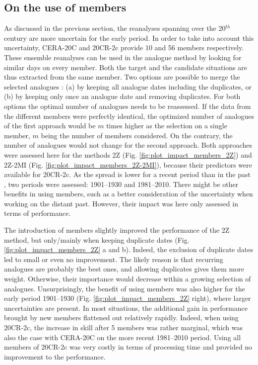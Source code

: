 \documentclass{ametsoc}
\begin{document}
\subsection{On the use of members}
\label{sec:ensemble}

As discussed in the previous section, the reanalyses spanning over the 20$^{th}$ century are more uncertain for the early period. In order to take into account this uncertainty, CERA-20C and 20CR-2c provide 10 and 56 members respectively. These ensemble reanalyses can be used in the analogue method by looking for similar days on every member. Both the target and the candidate situations are thus extracted from the same member. Two options are possible to merge the selected analogues : (a) by keeping all analogue dates including the duplicates, or (b) by keeping only once an analogue date and removing duplicates. For both options the optimal number of analogues needs to be reassessed. If the data from the different members were perfectly identical, the optimized number of analogues of the first approach would be $m$ times higher as the selection on a single member, $m$ being the number of members considered. On the contrary, the number of analogues would not change for the second approach. Both approaches were assessed here for the methods 2Z (Fig. \ref{fig:plot_impact_members_2Z}) and 2Z-2MI (Fig. \ref{fig:plot_impact_members_2Z-2MI}), because their predictors were available for 20CR-2c. As the spread is lower for a recent period than in the past \citep{Compo2011}, two periods were assessed: 1901--1930 and 1981--2010. There might be other benefits in using members, such as a better consideration of the uncertainty when working on the distant past. However, their impact was here only assessed in terms of performance.

The introduction of members slightly improved the performance of the 2Z method, but only/mainly when keeping duplicate dates (Fig. \ref{fig:plot_impact_members_2Z} a and b). Indeed, the exclusion of duplicate dates led to small or even no improvement. The likely reason is that recurring analogues are probably the best ones, and allowing duplicates gives them more weight. Otherwise, their importance would decrease within a growing selection of analogues. Unsurprisingly, the benefit of using members was also higher for the early period 1901--1930 (Fig. \ref{fig:plot_impact_members_2Z} right), where larger uncertainties are present. In most situations, the additional gain in performance brought by new members flattened out relatively rapidly. Indeed, when using 20CR-2c, the increase in skill after 5 members was rather marginal, which was also the case with CERA-20C on the more recent 1981--2010 period. Using all members of 20CR-2c was very costly in terms of processing time and provided no improvement to the performance. 
\end{document}
